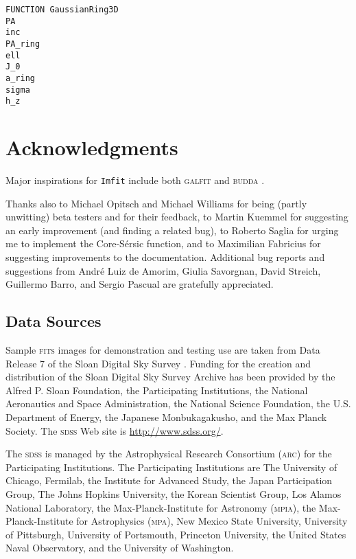 \documentclass[10pt,a4paper,article]{memoir}
\newcommand{\Imfit}{\texttt{Imfit}}
\begin{document}
\begin{verbatim}
FUNCTION GaussianRing3D
PA
inc
PA_ring
ell
J_0
a_ring
sigma
h_z
\end{verbatim}





\chapter{Acknowledgments}

Major inspirations for \Imfit{} include both \textsc{galfit} \citep{peng02,peng10} and 
\textsc{budda} \citep{desouza04,gadotti08}.

Thanks also to Michael Opitsch and Michael Williams for being (partly
unwitting) beta testers and for their feedback, to Martin Kuemmel for
suggesting an early improvement (and finding a related bug), to Roberto Saglia
for urging me to implement the Core-S{\'e}rsic function, and to
Maximilian Fabricius for suggesting improvements to the documentation.
Additional bug reports and suggestions from Andr{\'e} Luiz de Amorim,
Giulia Savorgnan, David Streich, Guillermo Barro, and Sergio Pascual are gratefully
appreciated.


\section{Data Sources}

Sample \textsc{fits} images for demonstration and testing use are taken from Data Release
7 \citep{abazajian09} of the Sloan Digital Sky Survey \citep{york00}. Funding
for the creation and distribution of the Sloan Digital Sky Survey Archive has been provided by the
Alfred P. Sloan Foundation, the Participating Institutions, the National
Aeronautics and Space Administration, the National Science Foundation, the U.S.
Department of Energy, the Japanese Monbukagakusho, and the Max Planck Society. 
The \textsc{sdss} Web site is \url{http://www.sdss.org/}.

The \textsc{sdss} is managed by the Astrophysical Research Consortium (\textsc{arc}) for
the Participating Institutions.  The Participating Institutions are
The University of Chicago, Fermilab, the Institute for Advanced Study,
the Japan Participation Group, The Johns Hopkins University, the
Korean Scientist Group, Los Alamos National Laboratory, the
Max-Planck-Institute for Astronomy (\textsc{mpia}), the Max-Planck-Institute
for Astrophysics (\textsc{mpa}), New Mexico State University, University of
Pittsburgh, University of Portsmouth, Princeton University, the United
States Naval Observatory, and the University of Washington.
\end{document}
